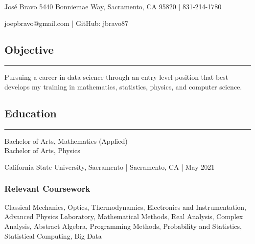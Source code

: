 \documentclass[letterpaper, 10 pt]{article}
\begin{document}
\centerline{\huge Jos\'e Bravo \hfill \normalsize 5440 Bonniemae Way, Sacramento, CA 95820 | 831-214-1780}
\hspace*{\fill} joepbravo@gmail.com | GitHub: jbravo87

\subsection*{Objective}
\noindent\rule[0.75ex]{\linewidth}{0.55 pt}
Pursuing a career in data science through an entry-level position that best develops my training in mathematics, statistics, physics, and computer science.


\subsection*{Education}
\noindent\rule[0.75ex]{\linewidth}{0.55 pt}
Bachelor of Arts, Mathematics (Applied) \\
Bachelor of Arts, Physics

California State University, Sacramento | Sacramento, CA | May 2021 %
\subsubsection*{Relevant Coursework}
\quad Classical Mechanics, Optics, Thermodynamics, Electronics and Instrumentation, Advanced Physics Laboratory, Mathematical Methods, Real Analysis, Complex Analysis, Abstract Algebra, Programming Methods, Probability and Statistics, Statistical Computing, Big Data %
\end{document}
